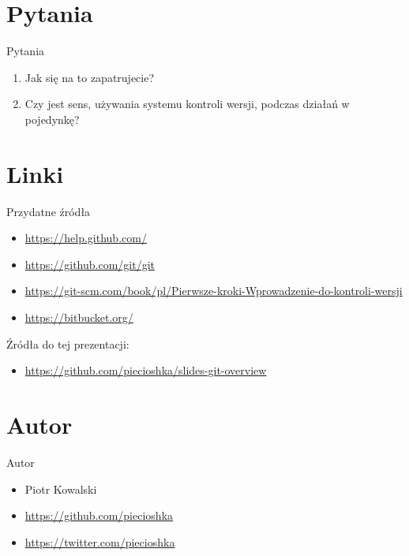 \documentclass{beamer}
\begin{document}

\section{Pytania}

\begin{frame}{Pytania}
\begin{enumerate}
  \item Jak się na to zapatrujecie?
  \item Czy jest sens, używania systemu kontroli wersji, podczas działań w pojedynkę?
\end{enumerate}
\end{frame}


\section{Linki}

\begin{frame}{Przydatne źródła}
\begin{itemize}
  \item \url{https://help.github.com/}
  \item \url{https://github.com/git/git}
  \item \url{https://git-scm.com/book/pl/Pierwsze-kroki-Wprowadzenie-do-kontroli-wersji}
  \item \url{https://bitbucket.org/}
\end{itemize}
\vskip 1cm
Źródła do tej prezentacji:
\begin{itemize}
  \item \url{https://github.com/piecioshka/slides-git-overview}
\end{itemize}
\end{frame}


\section{Autor}

\begin{frame}{Autor}
\begin{itemize}
  \item Piotr Kowalski
  \item \url{https://github.com/piecioshka}
  \item \url{https://twitter.com/piecioshka}
\end{itemize}
\end{frame}
\end{document}
